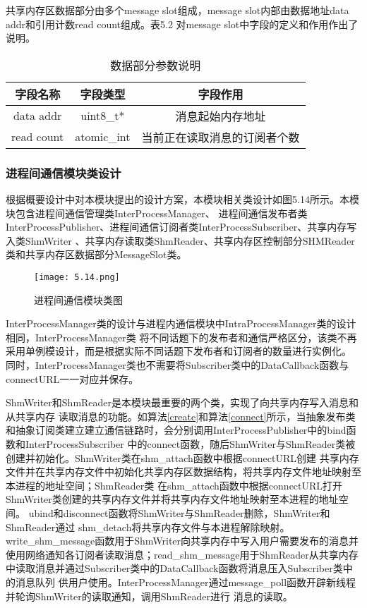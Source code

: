 共享内存区数据部分由多个message slot组成，message slot内部由数据地址data addr和引用计数read count组成。表5.2
对message slot中字段的定义和作用作出了说明。
\begin{table}[htb]
  \centering\small
  \caption{数据部分参数说明}
  \label{tab:exampletable}
  \begin{tabular}{ccc}
    \toprule
    字段名称 & 字段类型 & 字段作用\\
    \midrule
    data addr & uint8\_t*& 消息起始内存地址\\
    read count & atomic\_int & 当前正在读取消息的订阅者个数\\
    \bottomrule
  \end{tabular}
\end{table}

\subsubsection{进程间通信模块类设计}
根据概要设计中对本模块提出的设计方案，本模块相关类设计如图5.14所示。本模块包含进程间通信管理类InterProcessManager、
进程间通信发布者类InterProcessPublisher、进程间通信订阅者类InterProcessSubscriber、共享内存写入类ShmWriter
、共享内存读取类ShmReader、共享内存区控制部分SHMReader类和共享内存区数据部分MessageSlot类。

\begin{figure}[H]
  \centering
  \texttt{[image: 5.14.png]}
  \caption{进程间通信模块类图}
  \label{fig:11}
\end{figure}
InterProcessManager类的设计与进程内通信模块中IntraProcessManager类的设计相同，InterProcessManager类
将不同话题下的发布者和通信严格区分，该类不再采用单例模设计，而是根据实际不同话题下发布者和订阅者的数量进行实例化。
同时，InterProcessManager类也不需要将Subscriber类中的DataCallback函数与connectURL一一对应并保存。

ShmWriter和ShmReader是本模块最重要的两个类，实现了向共享内存写入消息和从共享内存
读取消息的功能。如算法\ref{create}和算法\ref{connect}所示，当抽象发布类和抽象订阅类建立建立通信链路时，会分别调用InterProcessPublisher中的bind函数和InterProcessSubscriber
中的connect函数，随后ShmWriter与ShmReader类被创建并初始化。ShmWriter类在shm\_attach函数中根据connectURL创建
共享内存文件并在共享内存文件中初始化共享内存区数据结构，将共享内存文件地址映射至本进程的地址空间；ShmReader类
在shm\_attach函数中根据connectURL打开ShmWriter类创建的共享内存文件并将共享内存文件地址映射至本进程的地址空间。
ubind和disconnect函数将ShmWriter与ShmReader删除，ShmWriter和ShmReader通过
shm\_detach将共享内存文件与本进程解除映射。write\_shm\_message函数用于ShmWriter向共享内存中写入用户需要发布的消息并
使用网络通知各订阅者读取消息；read\_shm\_message用于ShmReader从共享内存中读取消息并通过Subscriber类中的DataCallback函数将消息压入Subscriber类中的消息队列
供用户使用。InterProcessManager通过message\_poll函数开辟新线程并轮询ShmWriter的读取通知，调用ShmReader进行
消息的读取。

